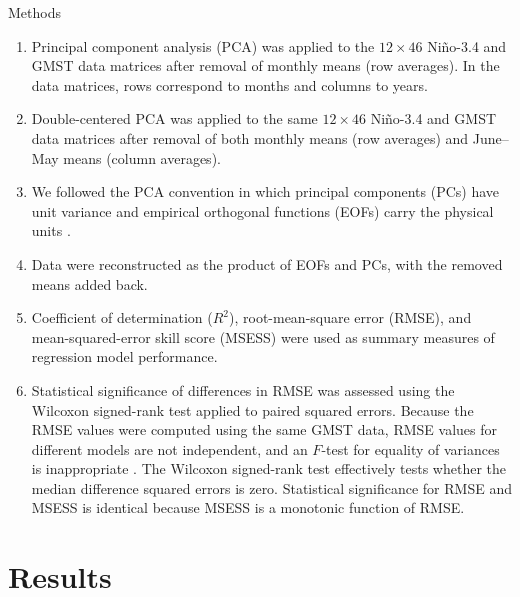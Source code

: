 \documentclass[aspectratio=169,xcolor=dvipsnames]{beamer}
\begin{document}
\begin{frame}{Methods}
  \begin{enumerate}\tiny

  \item Principal component analysis (PCA) was applied to the
    $12 \times 46$ Ni\~no-3.4 and GMST data matrices after removal of
    monthly means (row averages). In the data matrices, rows
    correspond to months and columns to years.
    
  \item Double-centered PCA was applied to the same $12 \times 46$
    Ni\~no-3.4 and GMST data matrices after removal of both monthly
    means (row averages) and June--May means (column averages).

  \item We followed the PCA convention in which principal components
    (PCs) have unit variance and empirical orthogonal functions (EOFs)
    carry the physical units \citep{DelsoleTippettBook}.

\item Data were reconstructed as the product of EOFs and PCs, with
  the removed means added back.

\item Coefficient of determination ($R^2$), root-mean-square error
  (RMSE), and mean-squared-error skill score (MSESS) were used as
  summary measures of regression model performance.

  \item Statistical significance of differences in RMSE was assessed
    using the Wilcoxon signed-rank test applied to paired squared
    errors. Because the RMSE values were computed using the same GMST
    data, RMSE values for different models are not independent, and an
    $F$-test for equality of variances is inappropriate
    \citep{TDS:Comparing:2014}. The Wilcoxon signed-rank test
    effectively tests whether the median difference squared errors is
    zero. Statistical significance for RMSE and MSESS is identical
    because MSESS is a monotonic function of RMSE.
    
  \end{enumerate}
\end{frame}

\section{Results}\label{sec:results}
\end{document}
